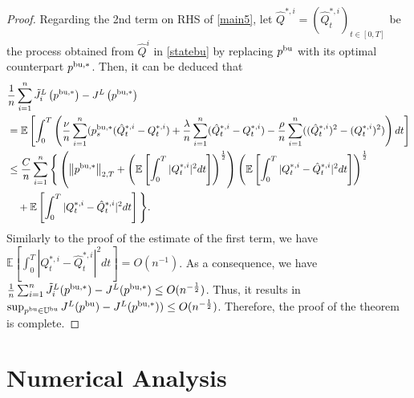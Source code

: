 \documentclass[11pt]{article}
\numberwithin{equation}{section}
\begin{document}
\begin{proof}
Regarding the 2nd term on RHS of \eqref{main5},
let $\hat{Q}^{*,i}=(\hat{Q}_t^{*,i})_{t\in[0,T]}$ be the process obtained from $\hat{Q}^i$ in \eqref{statebu} by replacing  $p^{{\rm bu}}$ with its optimal counterpart $p^{{\rm bu},*}$. Then, it can be deduced that
\begin{align*}
&\frac{1}{n}\sum_{i=1}^n\tilde{J}_i^L\left(p^{{\rm bu},*}\right)-J^L\left(p^{{\rm bu},*}\right)\\
&=\mathbb{E}\left[\int_0^T\left(\frac{\nu}{n}\sum_{i=1}^n(p_s^{{\rm bu},*}(\hat{Q}_t^{*,i}-Q_t^{*,i})+\frac{\lambda}{n}\sum_{i=1}^n(\hat{Q}_t^{*,i}-Q_t^{*, i})-\frac{\rho}{n}\sum_{i=1}^n((\hat{Q}_t^{*,i})^2-(Q_t^{*,i})^2)\right)dt\right]\\
&\leq \frac{C}{n}\sum_{i=1}^n\Bigg\{\left(\left\|p^{{\rm bu},*}\right\|_{2,T}+\left( \mathbb{E}\left[\int_0^T|Q_t^{*,i}|^2dt\right]\right)^{\frac{1}{2}}\right)\left( \mathbb{E}\left[\int_0^T|Q_t^{*, i}-\hat{Q}_t^{*,i}|^2dt\right]\right)^{\frac{1}{2}}\\
&\quad +\mathbb{E}\left[\int_0^T|Q_t^{*,i}-\hat{Q}_t^{*,i}|^2dt\right]\Bigg\}.
\end{align*}
Similarly to the proof of the estimate of the first term, we have $\mathbb{E}[\int_0^T|Q_t^{*,i}-\hat{Q}_t^{*,i}|^2dt]=O(n^{-1})$. As a consequence,  we have $\frac{1}{n}\sum_{i=1}^n\tilde{J}_i^L(p^{{\rm bu},*})-J^L(p^{{\rm bu},*})\leq O(n^{-\frac{1}{2}})$. Thus, it results in $\sup_{p^{{\rm bu}}\in\mathbb{U}^{\rm bu}}J^L(p^{{\rm bu}})-J^L(p^{{\rm bu},*}))\leq O(n^{-\frac{1}{2}})$. Therefore, the proof of the theorem is complete.
\end{proof}

\section{Numerical Analysis}\label{sec:numerical}
\end{document}
